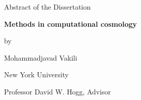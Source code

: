 \documentclass[12pt,letterpaper]{article}
\newcommand{\thesistitle}{Methods in computational cosmology}
\newcommand{\thesisauthor}{Mohammadjavad Vakili}
\newcommand{\thesisadvisor}{Professor David W. Hogg}
\begin{document}
  \begin{center}
    Abstract of the Dissertation\bigskip

    \textbf{\thesistitle}\bigskip

    by\bigskip

    \thesisauthor\bigskip

    New York University\bigskip

    \thesisadvisor, Advisor
  \end{center}
\bigskip


\end{document}
